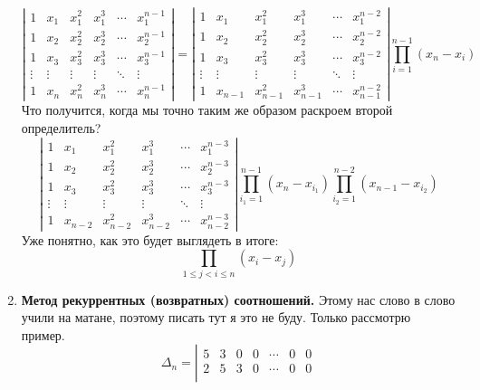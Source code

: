 \documentclass{article}
\begin{document}
\begin{enumerate}
        \[
        \left|\begin{matrix}
            1 & x_1 & x_1^2 & x_1^3 & \cdots & x_1^{n-1}\\
            1 & x_2 & x_2^2 & x_2^3 & \cdots & x_2^{n-1}\\
            1 & x_3 & x_3^2 & x_3^3 & \cdots & x_3^{n-1}\\
            \vdots & \vdots & \vdots & \vdots & \ddots & \vdots\\
            1 & x_n & x_n^2 & x_n^3 & \cdots & x_n^{n-1}
        \end{matrix}\right|=
        \left|\begin{matrix}
            1 & x_1 & x_1^2 & x_1^3 & \cdots & x_1^{n-2}\\
            1 & x_2 & x_2^2 & x_2^3 & \cdots & x_2^{n-2}\\
            1 & x_3 & x_3^2 & x_3^3 & \cdots & x_3^{n-2}\\
            \vdots & \vdots & \vdots & \vdots & \ddots & \vdots\\
            1 & x_{n-1} & x_{n-1}^2 & x_{n-1}^3 & \cdots & x_{n-1}^{n-2}
        \end{matrix}\right|\prod_{i=1}^{n-1}(x_n-x_i)
        \]
        Что получится, когда мы точно таким же образом раскроем второй определитель?
        $$
        \left|\begin{matrix}
            1 & x_1 & x_1^2 & x_1^3 & \cdots & x_1^{n-3}\\
            1 & x_2 & x_2^2 & x_2^3 & \cdots & x_2^{n-3}\\
            1 & x_3 & x_3^2 & x_3^3 & \cdots & x_3^{n-3}\\
            \vdots & \vdots & \vdots & \vdots & \ddots & \vdots\\
            1 & x_{n-2} & x_{n-2}^2 & x_{n-2}^3 & \cdots & x_{n-2}^{n-3}
        \end{matrix}\right|\prod_{i_1=1}^{n-1}(x_n-x_{i_1})\prod_{i_2=1}^{n-2}(x_{n-1}-x_{i_2})
        $$
        Уже понятно, как это будет выглядеть в итоге:
        $$
        \prod_{1\leqslant j<i\leqslant n}(x_i-x_j)
        $$
        \item \textbf{Метод рекуррентных (возвратных) соотношений.}
        Этому нас слово в слово учили на матане, поэтому писать тут я это не буду. Только рассмотрю пример.
        $$
        \Delta_n=\left|\begin{matrix}
            5 & 3 & 0 & 0 & \cdots & 0 & 0\\
            2 & 5 & 3 & 0 & \cdots & 0 & 0\\

\end{matrix}$$
\end{enumerate}
\end{document}
